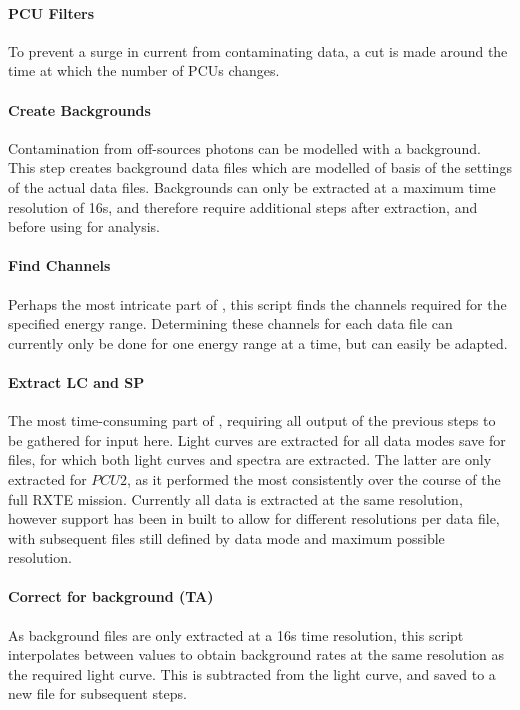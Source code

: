 \paragraph{PCU Filters} To prevent a surge in current from contaminating data, a cut is made around the time at which the number of \acp{PCU} changes. 

\paragraph{Create Backgrounds} Contamination from off-sources photons can be modelled with a background. This step creates background data files which are modelled of basis of the settings of the actual data files. Backgrounds can only be extracted at a maximum time resolution of 16s, and therefore require additional steps after extraction, and before using for analysis.

\paragraph{Find Channels} Perhaps the most intricate part of \chromos, this script finds the channels required for the specified energy range. Determining these channels for each data file can currently only be done for one energy range at a time, but can easily be adapted.

\paragraph{Extract LC and SP} The most time-consuming part of \chromos, requiring all output of the previous steps to be gathered for input here. Light curves are extracted for all data modes save for  files, for which both light curves and spectra are extracted. The latter are only extracted for $PCU2$, as it performed the most consistently over the course of the full \ac{RXTE} mission. Currently all data is extracted at the same resolution, however support has been in built to allow for different resolutions per data file, with subsequent files still defined by data mode and maximum possible resolution.

\paragraph{Correct for background (TA)} As background files are only extracted at a 16s time resolution, this script interpolates between values to obtain background rates at the same resolution as the required light curve. This is subtracted from the light curve, and saved to a new file for subsequent steps.

